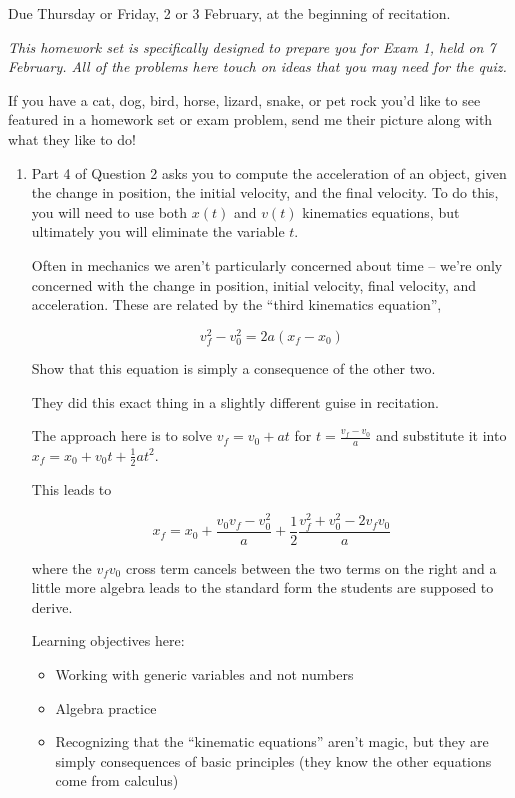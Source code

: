 \documentclass[12pt]{article}
\begin{document}
\Large
\centerline{}


\begin{center} \normalsize Due Thursday or Friday, 2 or 3 February, at the beginning of recitation. 
\end{center}
\normalsize

\it This homework set is specifically designed to prepare you for Exam 1, held on 7 February. All of the problems here touch on ideas that you may need for the quiz. 

If you have a cat, dog, bird, horse, lizard, snake, or pet rock you'd like to see featured in a homework set or exam problem, send me their picture along with what they like to do!

\rm
\begin{enumerate}

\item Part 4 of Question 2 asks you to compute the acceleration of an object, given the change in position, the initial velocity, and the final velocity. To do this, you will need to use both $x(t)$ and $v(t)$ kinematics equations, but ultimately you will eliminate the variable $t$.

Often in mechanics we aren't particularly concerned about time -- we're only concerned with the change in position, initial velocity, final velocity, and acceleration.
These are related by the ``third kinematics equation'', 

$$
v_f^2 - v_0^2 = 2a(x_f - x_0)
$$

Show that this equation is simply a consequence of the other two.
{
\color{red}
They did this exact thing in a slightly different guise in recitation.

The approach here is to solve $v_f = v_0 + at$ for $t = \frac{v_f - v_0}{a}$ and substitute it into $x_f = x_0 + v_0 t + \frac{1}{2}at^2$.

This leads to

$$
x_f = x_0 + \frac{v_0 v_f - v_0^2}{a} + \frac{1}{2} \frac{v_f^2 + v_0^2 - 2 v_f v_0}{a}
$$

where the $v_f v_0$ cross term cancels between the two terms on the right and a little more algebra leads to the standard form the students are supposed to derive.

Learning objectives here:

\begin{itemize}
	\item Working with generic variables and not numbers
	\item Algebra practice
	\item Recognizing that the ``kinematic equations'' aren't magic, but they are simply consequences of basic principles (they know the other equations come from calculus)
\end{itemize}
}



\end{enumerate}
\end{document}
